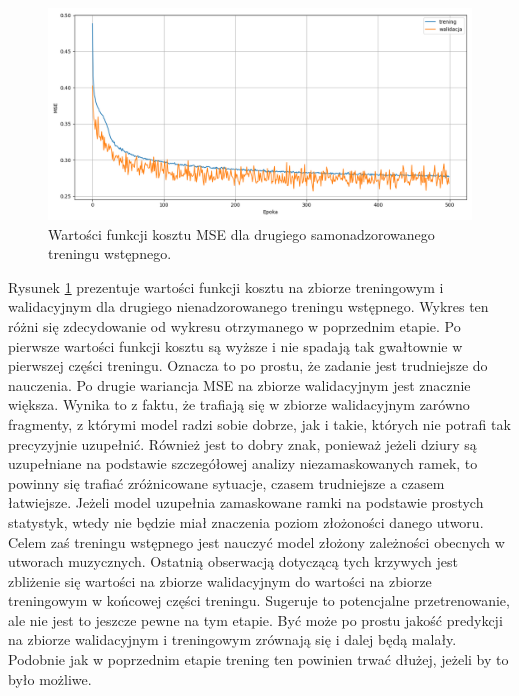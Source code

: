 \begin{figure}
    \centering
    \includegraphics[width=1.0\textwidth]{./images/mae2_loss.png}
    \caption{Wartości funkcji kosztu MSE dla drugiego samonadzorowanego treningu wstępnego.}
    \label{fig:mae2_loss}
\end{figure}

Rysunek \ref{fig:mae2_loss} prezentuje wartości funkcji kosztu na zbiorze treningowym i walidacyjnym dla drugiego nienadzorowanego treningu wstępnego. Wykres ten różni się zdecydowanie od wykresu otrzymanego w poprzednim etapie. Po pierwsze wartości funkcji kosztu są wyższe i nie spadają tak gwałtownie w pierwszej części treningu. Oznacza to po prostu, że zadanie jest trudniejsze do nauczenia. Po drugie wariancja MSE na zbiorze walidacyjnym jest znacznie większa. Wynika to z faktu, że trafiają się w zbiorze walidacyjnym zarówno fragmenty, z którymi model radzi sobie dobrze, jak i takie, których nie potrafi tak precyzyjnie uzupełnić. Również jest to dobry znak, ponieważ jeżeli dziury są uzupełniane na podstawie szczegółowej analizy niezamaskowanych ramek, to powinny się trafiać zróżnicowane sytuacje, czasem trudniejsze a czasem łatwiejsze. Jeżeli model uzupełnia zamaskowane ramki na podstawie prostych statystyk, wtedy nie będzie miał znaczenia poziom złożoności danego utworu. Celem zaś treningu wstępnego jest nauczyć model złożony zależności obecnych w utworach muzycznych. Ostatnią obserwacją dotyczącą tych krzywych jest zbliżenie się wartości na zbiorze walidacyjnym do wartości na zbiorze treningowym w końcowej części treningu. Sugeruje to potencjalne przetrenowanie, ale nie jest to jeszcze pewne na tym etapie. Być może po prostu jakość predykcji na zbiorze walidacyjnym i treningowym zrównają się i dalej będą malały. Podobnie jak w poprzednim etapie trening ten powinien trwać dłużej, jeżeli by to było możliwe.

